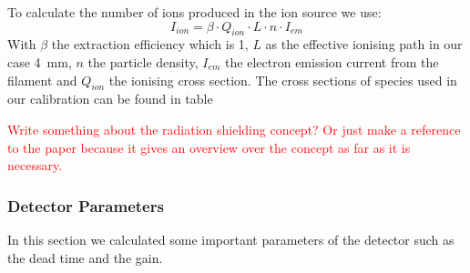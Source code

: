 
		To calculate the number of ions produced in the ion source we use:
		\begin{equation}
		I_{ion} = \beta\cdot Q_{ion}\cdot L\cdot n\cdot I_{em}
		\end{equation}
		With $\beta$ the extraction efficiency which is 1, %
		$L$ as the effective ionising path in our case 4~\si{\milli\metre}, $n$ the particle density, $I_{em}$ the electron emission current from the filament and $Q_{ion}$ the ionising cross section. The cross sections of species used in our calibration can be found in table %
		
		\textcolor{red}{Write something about the radiation shielding concept? Or just make a reference to the paper because it gives an overview over the concept as far as it is necessary.}
		
		\subsubsection{Detector Parameters } %
		
		In this section we calculated some important parameters of the detector such as the dead time and the gain. %
		
